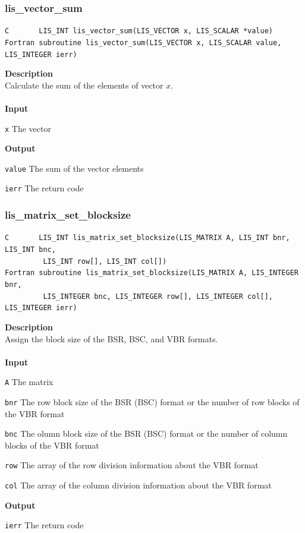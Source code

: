 \documentclass[a4paper]{article}
\newcommand{\namelistlabel}[1]{\mbox{#1}\hfill}
\newenvironment{namelist}[1]{%
\begin{list}{}
  {\let\makelabel\namelistlabel
  \settowidth{\labelwidth}{#1}
  \setlength{\leftmargin}{1.1\labelwidth}}
  }{%
\end{list}}
\begin{document}
\subsubsection{lis\_vector\_sum}
\begin{screen}
\verb|C       LIS_INT lis_vector_sum(LIS_VECTOR x, LIS_SCALAR *value)|\\
\verb|Fortran subroutine lis_vector_sum(LIS_VECTOR x, LIS_SCALAR value, LIS_INTEGER ierr)|
\end{screen}
{\bf Description}\\
\indent
Calculate the sum of the elements of vector $x$.
\\ \\
\noindent
{\bf Input}
\begin{namelist}{XXXXXXXXXXXXXXXXXXXX}
\item[\tt x] The vector
\end{namelist}
{\bf Output}
\begin{namelist}{XXXXXXXXXXXXXXXXXXXX}
\item[\tt value] The sum of the vector elements 
\item[\tt ierr] The return code
\end{namelist}

\newpage
\subsubsection{lis\_matrix\_set\_blocksize}
\begin{screen}
\verb|C       LIS_INT lis_matrix_set_blocksize(LIS_MATRIX A, LIS_INT bnr, LIS_INT bnc,|\\
\verb|         LIS_INT row[], LIS_INT col[])|\\
\verb|Fortran subroutine lis_matrix_set_blocksize(LIS_MATRIX A, LIS_INTEGER bnr,|\\
\verb|         LIS_INTEGER bnc, LIS_INTEGER row[], LIS_INTEGER col[], LIS_INTEGER ierr)|
\end{screen}
{\bf Description}\\
\indent
Assign the block size of the BSR, BSC, and VBR formats.
\\ \\
\noindent
{\bf Input}
\begin{namelist}{XXXXXXXXXXXXXXXXXXXX}
\item[\tt A] The matrix
\item[\tt bnr] The row block size of the BSR (BSC) format or the number of 
	     row blocks of the VBR format
\item[\tt bnc] The olumn block size of the BSR (BSC) format or the
	     number of column blocks of the VBR format
\item[\tt row] The array of the row division information about the VBR format
\item[\tt col] The array of the column division information about the
	     VBR format
\end{namelist}
{\bf Output}
\begin{namelist}{XXXXXXXXXXXXXXXXXXXX}
\item[\tt ierr] The return code
\end{namelist}
\end{document}

